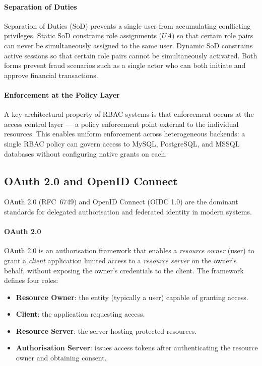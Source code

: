 \paragraph{Separation of Duties}

Separation of Duties (SoD) prevents a single user from accumulating conflicting privileges. Static SoD constrains role assignments ($UA$) so that certain role pairs can never be simultaneously assigned to the same user. Dynamic SoD constrains active sessions so that certain role pairs cannot be simultaneously activated. Both forms prevent fraud scenarios such as a single actor who can both initiate and approve financial transactions.

\paragraph{Enforcement at the Policy Layer}

A key architectural property of RBAC systems is that enforcement occurs at the access control layer — a policy enforcement point external to the individual resources. This enables uniform enforcement across heterogeneous backends: a single RBAC policy can govern access to MySQL, PostgreSQL, and MSSQL databases without configuring native grants on each.

\subsection{OAuth 2.0 and OpenID Connect}

OAuth 2.0 (RFC~6749) and OpenID Connect (OIDC 1.0) are the dominant standards for delegated authorisation and federated identity in modern systems.

\paragraph{OAuth 2.0}

OAuth 2.0 is an authorisation framework that enables a \emph{resource owner} (user) to grant a \emph{client} application limited access to a \emph{resource server} on the owner's behalf, without exposing the owner's credentials to the client. The framework defines four roles:

\begin{itemize}
    \item \textbf{Resource Owner}: the entity (typically a user) capable of granting access.
    \item \textbf{Client}: the application requesting access.
    \item \textbf{Resource Server}: the server hosting protected resources.
    \item \textbf{Authorisation Server}: issues access tokens after authenticating the resource owner and obtaining consent.
\end{itemize}

